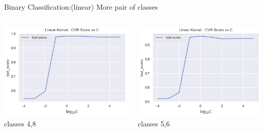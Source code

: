 \documentclass[12pt,t]{beamer}
\begin{document}
\begin{frame}[t]{Binary Classification:(linear) More pair of classes}
\begin{columns}
\begin{column}[]{0.25\linewidth}
        \includegraphics[width=\linewidth]{images/p1a/2(binary clf)/classes4and8_libsvm_linear25f.png}
        \centering classes 4,8
    \end{column}
    \begin{column}[]{0.25\linewidth}
        \includegraphics[width=\linewidth]{images/p1a/2(binary clf)/classes5and6_libsvm_linear25f.png}
        \centering classes 5,6
    \end{column}
    
\end{columns}


\end{frame}
\end{document}
